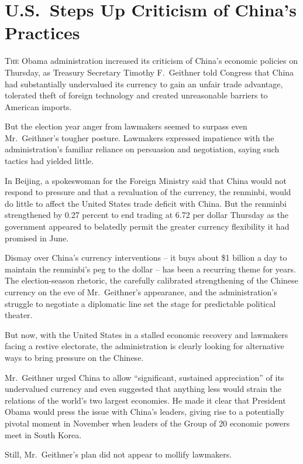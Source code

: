 ﻿\documentclass[12pt]{article}
\begin{document}
\pagebreak
\section{U.S.~Steps Up Criticism of China's Practices}

\lettrine{T}{he} Obama administration increased its criticism of China's
economic policies on Thursday, as Treasury Secretary Timothy F.~Geithner told Congress that China
had substantially undervalued its currency to gain an unfair trade advantage, tolerated theft of
foreign technology and created unreasonable barriers to American imports.

But the election year anger from lawmakers seemed to surpass even Mr.~Geithner's tougher posture.
Lawmakers expressed impatience with the administration's familiar reliance on persuasion and
negotiation, saying such tactics had yielded little.

In Beijing, a spokeswoman for the Foreign Ministry said that China would not respond to pressure and
that a revaluation of the currency, the renminbi, would do little to affect the United States trade
deficit with China. But the renminbi strengthened by 0.27 percent to end trading at 6.72 per dollar
Thursday as the government appeared to belatedly permit the greater currency flexibility it had
promised in June.

Dismay over China's currency interventions -- it buys about \$1 billion a day to maintain the
renminbi's peg to the dollar -- has been a recurring theme for years. The election-season rhetoric,
the carefully calibrated strengthening of the Chinese currency on the eve of Mr.~Geithner's
appearance, and the administration's struggle to negotiate a diplomatic line set the stage for
predictable political theater.

But now, with the United States in a stalled economic recovery and lawmakers facing a restive
electorate, the administration is clearly looking for alternative ways to bring pressure on the
Chinese.

Mr.~Geithner urged China to allow ``significant, sustained appreciation'' of its undervalued
currency and even suggested that anything less would strain the relations of the world's two largest
economies. He made it clear that President Obama would press the issue with China's leaders, giving
rise to a potentially pivotal moment in November when leaders of the Group of 20 economic powers
meet in South Korea.

Still, Mr.~Geithner's plan did not appear to mollify lawmakers.
\end{document}
